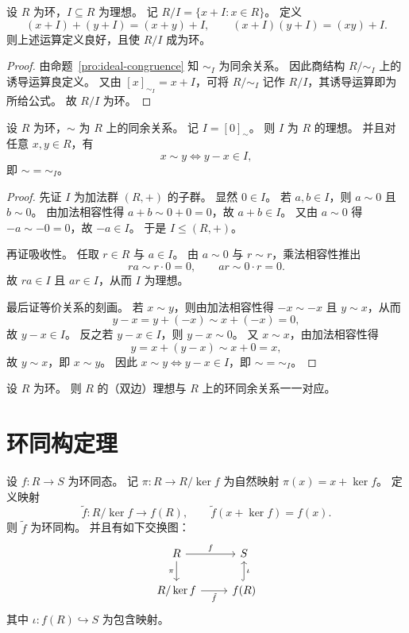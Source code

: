 \documentclass[lang=cn,a4paper,newtx]{elegantbook}
\begin{document}
\begin{proposition}[商环 $R/I$]
设 $R$ 为环，$I\subseteq R$ 为理想。
记 $R/I=\{x+I:x\in R\}$。
定义
\[
  (x+I)+(y+I)=(x+y)+I,\qquad (x+I)(y+I)=(xy)+I.
\]
则上述运算定义良好，且使 $R/I$ 成为环。
\end{proposition}

\begin{proof}
由命题~\ref{pro:ideal-congruence} 知 $\sim_I$ 为同余关系。
因此商结构 $R/\!\sim_I$ 上的诱导运算良定义。
又由 $[x]_{\sim_I}=x+I$，可将 $R/\!\sim_I$ 记作 $R/I$，其诱导运算即为所给公式。
故 $R/I$ 为环。
\end{proof}

\begin{proposition}[环同余的零元等价类]
设 $R$ 为环，$\sim$ 为 $R$ 上的同余关系。
记 $I=[0]_{\sim}$。
则 $I$ 为 $R$ 的理想。
并且对任意 $x,y\in R$，有
\[
  x\sim y\iff y-x\in I,
\]
即 $\sim=\sim_I$。
\end{proposition}

\begin{proof}
先证 $I$ 为加法群 $(R,+)$ 的子群。
显然 $0\in I$。
若 $a,b\in I$，则 $a\sim 0$ 且 $b\sim 0$。
由加法相容性得 $a+b\sim 0+0=0$，故 $a+b\in I$。
又由 $a\sim 0$ 得 $-a\sim -0=0$，故 $-a\in I$。
于是 $I\le (R,+)$。

再证吸收性。
任取 $r\in R$ 与 $a\in I$。
由 $a\sim 0$ 与 $r\sim r$，乘法相容性推出
\[
  ra\sim r\cdot 0=0,\qquad ar\sim 0\cdot r=0.
\]
故 $ra\in I$ 且 $ar\in I$，从而 $I$ 为理想。

最后证等价关系的刻画。
若 $x\sim y$，则由加法相容性得 $-x\sim -x$ 且 $y\sim x$，从而
\[
  y-x=y+(-x)\sim x+(-x)=0,
\]
故 $y-x\in I$。
反之若 $y-x\in I$，则 $y-x\sim 0$。
又 $x\sim x$，由加法相容性得
\[
  y=x+(y-x)\sim x+0=x,
\]
故 $y\sim x$，即 $x\sim y$。
因此 $x\sim y\iff y-x\in I$，即 $\sim=\sim_I$。
\end{proof}

\begin{corollary}
设 $R$ 为环。
则 $R$ 的（双边）理想与 $R$ 上的环同余关系一一对应。
\end{corollary}

\section{环同构定理}

\begin{proposition}
设 $f:R\to S$ 为环同态。
记 $\pi:R\to R/\ker f$ 为自然映射 $\pi(x)=x+\ker f$。
定义映射
\[
  \tilde f:R/\ker f\to f(R),\qquad \tilde f(x+\ker f)=f(x).
\]
则 $\tilde f$ 为环同构。
并且有如下交换图：
\[
\begin{tikzcd}
 R \arrow[r,"f"] \arrow[d,"\pi"'] & S \\
 R/\ker f \arrow[r,"\tilde f"'] & f(R) \arrow[u,hook,"\iota"']
\end{tikzcd}
\]
其中 $\iota:f(R)\hookrightarrow S$ 为包含映射。
\end{proposition}
\end{document}
